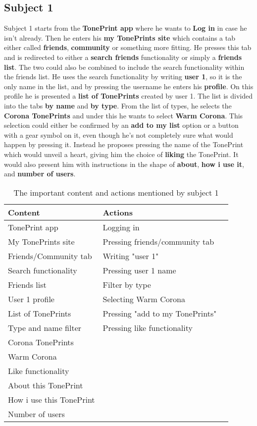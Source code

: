 \subsection*{Subject 1}
\label{Subject1}
Subject 1 starts from the \textbf{TonePrint app} where he wants to \textbf{Log in} in case he isn't already. Then he enters his \textbf{my TonePrints site} which contains a tab either called \textbf{friends}, \textbf{community} or something more fitting. He presses this tab and is redirected to either a \textbf{search friends} functionality or simply a \textbf{friends list}. The two could also be combined to include the search functionality within the friends list. He uses the search functionality by writing \textbf{user 1}, so it is the only name in the list, and by pressing the username he enters his \textbf{profile}. On this profile he is presented a \textbf{list of TonePrints} created by user 1. The list is divided into the tabs \textbf{by name} and \textbf{by type}. From the list of types, he selects the \textbf{Corona TonePrints} and under this he wants to select \textbf{Warm Corona}. This selection could either be confirmed by an \textbf{add to my list} option or a button with a gear symbol on it, even though he's not completely sure what would happen by pressing it. Instead he proposes pressing the name of the TonePrint which would unveil a heart, giving him the choice of \textbf{liking} the TonePrint. It would also present him with instructions in the shape of \textbf{about}, \textbf{how i use it}, and \textbf{number of users}.\\
%
\begin{table}[H]
\begin{minipage}[b]{\linewidth}\centering
	\begin{tabular} {|l|l|l|} \hline
		\rowcolor{xGray25} \textbf{Content} & \textbf{Actions} \\  \hline
		TonePrint app & Logging in \\
		My TonePrints site & Pressing friends/community tab \\
		Friends/Community tab & Writing "user 1" \\
		Search functionality & Pressing user 1 name \\
		Friends list & Filter by type \\
		User 1 profile & Selecting Warm Corona \\
		List of TonePrints & Pressing "add to my TonePrints" \\
		Type and name filter & Pressing like functionality \\
		Corona TonePrints & \\
		Warm Corona & \\
		Like functionality & \\
		About this TonePrint & \\
		How i use this TonePrint & \\
		Number of users & \\ \hline
	\end{tabular}
	\caption{The important content and actions mentioned by subject 1}
	\label{tab:Subject1ContentActions}
\end{minipage}
\end{table}
